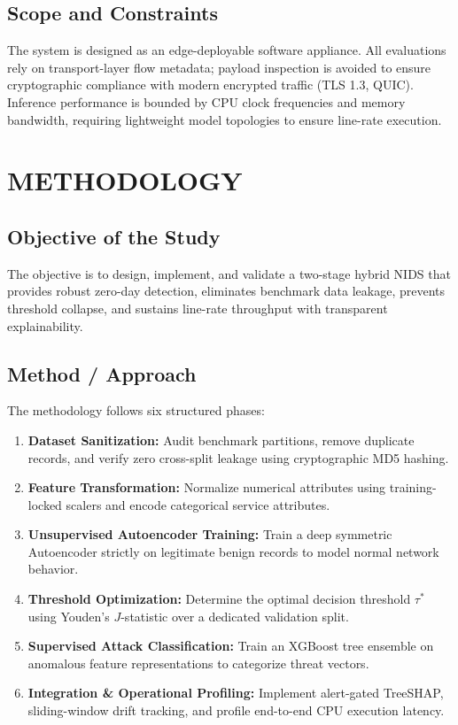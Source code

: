 \documentclass[12pt,a4paper]{report}
\begin{document}
\section{Scope and Constraints}
The system is designed as an edge-deployable software appliance. All evaluations rely on transport-layer flow metadata; payload inspection is avoided to ensure cryptographic compliance with modern encrypted traffic (TLS 1.3, QUIC). Inference performance is bounded by CPU clock frequencies and memory bandwidth, requiring lightweight model topologies to ensure line-rate execution.

\chapter{METHODOLOGY}

\section{Objective of the Study}
The objective is to design, implement, and validate a two-stage hybrid NIDS that provides robust zero-day detection, eliminates benchmark data leakage, prevents threshold collapse, and sustains line-rate throughput with transparent explainability.

\section{Method / Approach}
The methodology follows six structured phases:
\begin{enumerate}
    \item \textbf{Dataset Sanitization:} Audit benchmark partitions, remove duplicate records, and verify zero cross-split leakage using cryptographic MD5 hashing.
    \item \textbf{Feature Transformation:} Normalize numerical attributes using training-locked scalers and encode categorical service attributes.
    \item \textbf{Unsupervised Autoencoder Training:} Train a deep symmetric Autoencoder strictly on legitimate benign records to model normal network behavior.
    \item \textbf{Threshold Optimization:} Determine the optimal decision threshold $\tau^*$ using Youden's $J$-statistic over a dedicated validation split.
    \item \textbf{Supervised Attack Classification:} Train an XGBoost tree ensemble on anomalous feature representations to categorize threat vectors.
    \item \textbf{Integration \& Operational Profiling:} Implement alert-gated TreeSHAP, sliding-window drift tracking, and profile end-to-end CPU execution latency.
\end{enumerate}
\end{document}
